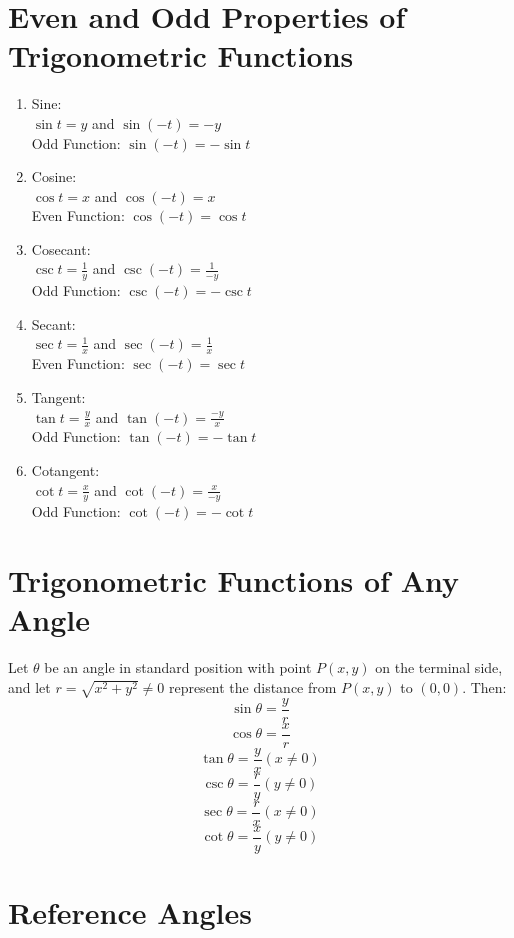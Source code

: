 \documentclass{article}
\begin{document}
\section{Even and Odd Properties of Trigonometric Functions}
\begin{enumerate}
  \item Sine:\\
    $\sin t=y$ and $\sin(-t)=-y$\\
    Odd Function: $\sin(-t)=-\sin t$

  \item Cosine:\\
    $\cos t=x$ and $\cos(-t)=x$\\
    Even Function: $\cos(-t)=\cos t$

  \item Cosecant:\\
    $\csc t=\frac{1}{y}$ and $\csc(-t)=\frac{1}{-y}$\\
    Odd Function: $\csc(-t)=-\csc t$

  \item Secant:\\
    $\sec t=\frac{1}{x}$ and $\sec(-t)=\frac{1}{x}$\\
    Even Function: $\sec(-t)=\sec t$

  \item Tangent:\\
    $\tan t=\frac{y}{x}$ and $\tan(-t)=\frac{-y}{x}$\\
    Odd Function: $\tan(-t)=-\tan t$

  \item Cotangent:\\
    $\cot t=\frac{x}{y}$ and $\cot(-t)=\frac{x}{-y}$\\
    Odd Function: $\cot(-t)=-\cot t$\\
\end{enumerate}

\section{Trigonometric Functions of Any Angle}
Let $\theta$ be an angle in standard position with point $P(x,y)$ on the
terminal side, and let $r=\sqrt{x^2+y^2}\ne0$ represent the distance from
$P(x,y)$ to $(0,0)$. Then:
\[\sin\theta=\frac{y}{r}\]
\[\cos\theta=\frac{x}{r}\]
\[\tan\theta=\frac{y}{x}(x\ne0)\]
\[\csc\theta=\frac{r}{y}(y\ne0)\]
\[\sec\theta=\frac{r}{x}(x\ne0)\]
\[\cot\theta=\frac{x}{y}(y\ne0)\]


\section{Reference Angles}
\end{document}
